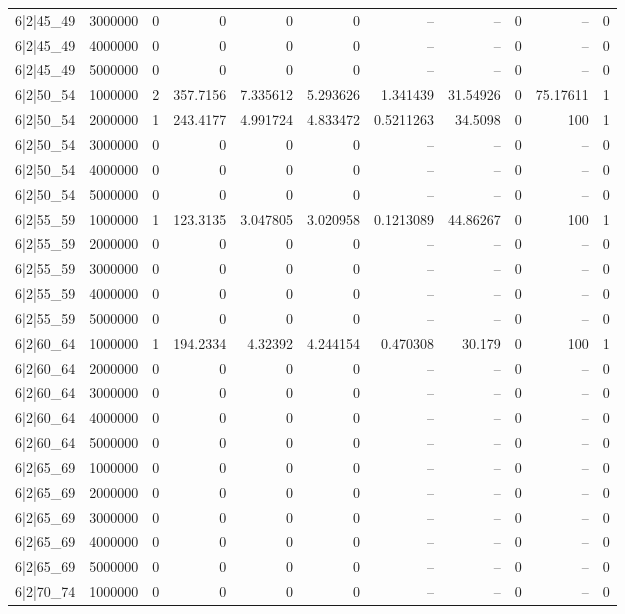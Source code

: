 \begin{tabular}{lrrrrrrrrrr}
6|2|45\_49 & 3000000 & 0 & 0 & 0 & 0 & -- & -- & 0 & -- & 0 \\
6|2|45\_49 & 4000000 & 0 & 0 & 0 & 0 & -- & -- & 0 & -- & 0 \\
6|2|45\_49 & 5000000 & 0 & 0 & 0 & 0 & -- & -- & 0 & -- & 0 \\
6|2|50\_54 & 1000000 & 2 & 357.7156 & 7.335612 & 5.293626 & 1.341439 & 31.54926 & 0 & 75.17611 & 1 \\
6|2|50\_54 & 2000000 & 1 & 243.4177 & 4.991724 & 4.833472 & 0.5211263 & 34.5098 & 0 & 100 & 1 \\
6|2|50\_54 & 3000000 & 0 & 0 & 0 & 0 & -- & -- & 0 & -- & 0 \\
6|2|50\_54 & 4000000 & 0 & 0 & 0 & 0 & -- & -- & 0 & -- & 0 \\
6|2|50\_54 & 5000000 & 0 & 0 & 0 & 0 & -- & -- & 0 & -- & 0 \\
6|2|55\_59 & 1000000 & 1 & 123.3135 & 3.047805 & 3.020958 & 0.1213089 & 44.86267 & 0 & 100 & 1 \\
6|2|55\_59 & 2000000 & 0 & 0 & 0 & 0 & -- & -- & 0 & -- & 0 \\
6|2|55\_59 & 3000000 & 0 & 0 & 0 & 0 & -- & -- & 0 & -- & 0 \\
6|2|55\_59 & 4000000 & 0 & 0 & 0 & 0 & -- & -- & 0 & -- & 0 \\
6|2|55\_59 & 5000000 & 0 & 0 & 0 & 0 & -- & -- & 0 & -- & 0 \\
6|2|60\_64 & 1000000 & 1 & 194.2334 & 4.32392 & 4.244154 & 0.470308 & 30.179 & 0 & 100 & 1 \\
6|2|60\_64 & 2000000 & 0 & 0 & 0 & 0 & -- & -- & 0 & -- & 0 \\
6|2|60\_64 & 3000000 & 0 & 0 & 0 & 0 & -- & -- & 0 & -- & 0 \\
6|2|60\_64 & 4000000 & 0 & 0 & 0 & 0 & -- & -- & 0 & -- & 0 \\
6|2|60\_64 & 5000000 & 0 & 0 & 0 & 0 & -- & -- & 0 & -- & 0 \\
6|2|65\_69 & 1000000 & 0 & 0 & 0 & 0 & -- & -- & 0 & -- & 0 \\
6|2|65\_69 & 2000000 & 0 & 0 & 0 & 0 & -- & -- & 0 & -- & 0 \\
6|2|65\_69 & 3000000 & 0 & 0 & 0 & 0 & -- & -- & 0 & -- & 0 \\
6|2|65\_69 & 4000000 & 0 & 0 & 0 & 0 & -- & -- & 0 & -- & 0 \\
6|2|65\_69 & 5000000 & 0 & 0 & 0 & 0 & -- & -- & 0 & -- & 0 \\
6|2|70\_74 & 1000000 & 0 & 0 & 0 & 0 & -- & -- & 0 & -- & 0 \\

\end{tabular}
